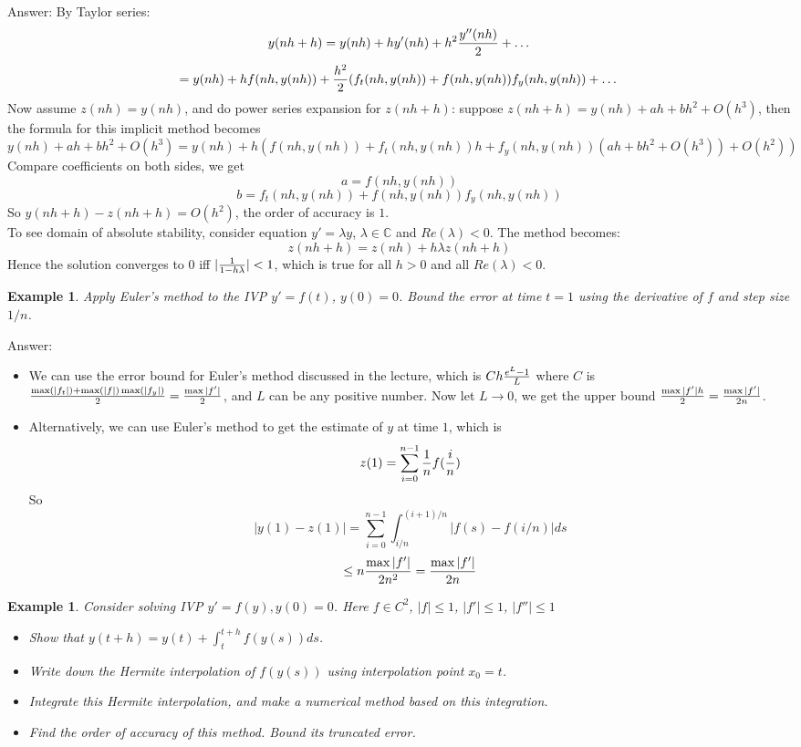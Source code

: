 \documentclass[20pt]{article} %
\theoremstyle{break}
\newtheorem{exa}[definition]{Example}
\begin{document}
Answer: By Taylor series:
\[y(nh+h)=y(nh)+hy'(nh)+h^2{y''(nh)\over 2}+\dots\]
\[=y(nh)+hf(nh, y(nh))+{h^2\over 2}(f_t(nh, y(nh))+f(nh, y(nh))f_y(nh, y(nh))+\dots\]
Now assume $z(nh)=y(nh)$, and do power series expansion for $z(nh+h)$: suppose $z(nh+h)=y(nh)+ah+bh^2+O(h^3)$, then the formula for this implicit method becomes
\[y(nh)+ah+bh^2+O(h^3)=y(nh)+h(f(nh, y(nh))+f_t(nh, y(nh))h+f_y(nh, y(nh))(ah+bh^2+O(h^3))+O(h^2))\]
Compare coefficients on both sides, we get
\[a=f(nh, y(nh))\]
\[b=f_t(nh, y(nh))+f(nh, y(nh))f_y(nh, y(nh))\]
So $y(nh+h)-z(nh+h)=O(h^2)$, the order of accuracy is $1$.\\

To see domain of absolute stability, consider equation $y'=\lambda y$, $\lambda\in\mathbb{C}$ and $Re(\lambda)<0$. The method becomes:
\[z(nh+h)=z(nh)+h\lambda z(nh+h)\]
Hence the solution converges to $0$ iff $|{1\over 1-h\lambda}|<1$, which is true for all $h>0$ and all $Re(\lambda)<0$. 


\newpage

\begin{exa}Apply Euler's method to the IVP $y'=f(t)$, $y(0)=0$. Bound the error at time $t=1$ using the derivative of $f$ and step size $1/n$.\end{exa}

Answer: \begin{itemize}
\item We can use the error bound for Euler's method discussed in the lecture, which is $Ch{e^L-1\over L}$ where $C$ is ${\max(|f_t|)+\max(|f|)\max(|f_y|)\over 2}={\max|f'|\over 2}$, and $L$ can be any positive number. Now let $L\rightarrow 0$, we get the upper bound ${\max|f'|h\over 2}={\max|f'|\over 2n}$.
\item Alternatively, we can use Euler's method to get the estimate of $y$ at time $1$, which is
  \[z(1)=\sum_{i=0}^{n-1}{1\over n}f({i\over n})\]
  So
  \[|y(1)-z(1)|=\sum_{i=0}^{n-1}\int_{i/n}^{(i+1)/n}|f(s)-f(i/n)|ds\]
  \[\leq n{\max|f'|\over 2n^2}={\max|f'|\over 2n}\]
\end{itemize}

\newpage

\begin{exa}Consider solving IVP $y'=f(y), y(0)=0$. Here $f\in C^2$, $|f|\leq 1$, $|f'|\leq 1$, $|f''|\leq 1$
  \begin{itemize}
   \item Show that $y(t+h)=y(t)+\int_t^{t+h}f(y(s))ds$.
   \item Write down the Hermite interpolation of $f(y(s))$ using interpolation point $x_0=t$.
   \item Integrate this Hermite interpolation, and make a numerical method based on this integration.
   \item Find the order of accuracy of this method. Bound its truncated error.
  \end{itemize}
\end{exa}
\end{document}
